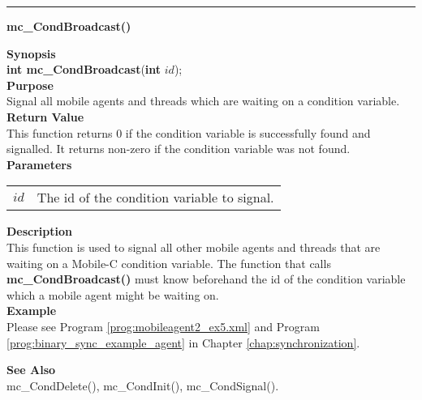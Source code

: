 \noindent
\vspace{5pt}
\rule{6.5in}{0.015in}
\noindent
{}
{\LARGE \bf mc\_CondBroadcast()}\\

\noindent
{\bf Synopsis}\\
{\bf int mc\_CondBroadcast}({\bf int} $id$);\\

\noindent
{\bf Purpose}\\
Signal all mobile agents and threads which are waiting on a condition 
variable.\\

\noindent
{\bf Return Value}\\
This function returns 0 if the condition variable is successfully found and 
signalled.
It returns non-zero if the condition variable was not found.\\

\noindent
{\bf Parameters}
\vspace{-0.1in}
\begin{description}
\item
\begin{tabular}{p{10 mm}p{145 mm}}
$id$ & The id of the condition variable to signal.
\end{tabular}
\end{description}

\noindent
{\bf Description}\\
This function is used to signal all other mobile agents and threads that are 
waiting on a Mobile-C condition variable. 
The function that calls {\bf mc\_CondBroadcast()} must know beforehand the id of 
the condition variable which a mobile agent might be waiting on.\\

\noindent
{\bf Example}\\
Please see Program \vref{prog:mobileagent2_ex5.xml} and 
Program \vref{prog:binary_sync_example_agent} in Chapter 
\ref{chap:synchronization}.
\noindent

\noindent
{\bf See Also}\\
mc\_CondDelete(), mc\_CondInit(), mc\_CondSignal().\\

